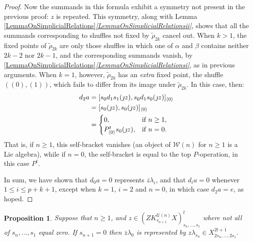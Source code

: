 \documentclass[11pt]{amsart} \renewcommand{\baselinestretch}{1.2}
\theoremstyle{plain}
\newtheorem{prop}[thm]{Proposition}
\numberwithin{equation}{section} %
\theoremstyle{plain}
\newtheorem{prop}[thm]{Proposition}
\numberwithin{equation}{chapter} %
\newcommand{\calU}{\mathcal{U}}
\newcommand{\calw}{\mathcal{W}}
\newcommand{\Sq}{\mathrm{Sq}}
\newcommand{\dver}{_\mathrm{v}}
\newcommand{\Sqvstar}[1]{\mathrm{Sq}\dver^{#1\star}}
\begin{document}
\begin{Koszul complexes}
\begin{proof}
Now the summands in this formula exhibit a symmetry not present in the previous proof: $z$ is repeated. This symmetry, along with Lemma \ref{LemmaOnSimplicialRelations}\emph{\ref{LemmaOnSimplicialRelationsii}}, shows that all the summands corresponding to shuffles not fixed by $\widetilde{\rho}_{2k}$ cancel out. When $k>1$, the fixed points of $\widetilde{\rho}_{2k}$ are only those shuffles in which one of $\alpha$ and $\beta$ contains neither $2k-2$ nor $2k-1$, and the corresponding summands vanish, by \ref{LemmaOnSimplicialRelations}\emph{\ref{LemmaOnSimplicialRelationsi}}, as in previous arguments. When $k=1$, however, $\widetilde{\rho}_{2k}$ has an \emph{extra} fixed point, the shuffle $((0),(1))$, which fails to differ from its image under $\widetilde{\rho}_{2k}$. In this case, then:
\begin{alignat*}{2}
d_2a
&=
[s_{0}d_1s_1(\jmath z), s_{0}d_1s_0(\jmath z)]_{\langle 0\rangle}%
\\
&=
[s_{0}(\jmath z), s_{0}(\jmath z)]_{\langle 0\rangle}\\
&=
\begin{cases}
0,&\textup{if }n\geq1,\\
P^{t}_{\langle 0\rangle}s_0(\jmath z),&\textup{if }n=0.
\end{cases}%
\end{alignat*}
That is, if $n\geq1$, this self-bracket vanishes (an object of $\calw(n)$ for $n\geq1$ is a Lie algebra), while if $n=0$, the self-bracket is equal to the top $P$-operation, in this case $P^t$.

In sum, we have shown that $d_0a=0$ represents $\overline{z}\lambda_i$, and that $d_ia=0$ whenever $1\leq i\leq p+k+1$, except when $k=1$, $i=2$ and $n=0$, in which case $d_2a=e$, as hoped.
\end{proof}
\begin{prop}
\label{Q0ZeroByPriddyAlg}
Suppose that $n\geq1$, and $z\in (ZK^{\calU(n)}_{s_{n+1}}X)_{s_n,\ldots,s_1}^t$ where not all of $s_n,\ldots,s_1$ equal zero. If $s_{n+1}=0$ then $\overline{z}\lambda_0$ is represented by $z\lambda_{s_n}\in X_{2s_n,\ldots,2s_1}^{2t+1}$. 



\end{prop}
\end{Koszul complexes}
\end{document}
